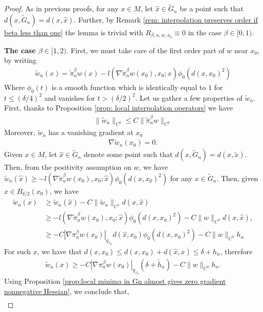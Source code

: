 \documentclass[11pt,reqno]{amsart}
\numberwithin{equation}{section}
\theoremstyle{plain}
\begin{document}
\begin{proof}
  As in previous proofs, for any $x \in M$, let $\hat x \in \tilde G_n$ be a point such that $d(x,\tilde G_n)=d(x,\hat x)$. Further, by Remark \ref{rem: interpolation preserves order if beta less than one} the lemma is trivial with $R_{\beta,n,w,x_0}\equiv 0$ in the case $\beta \in [0,1)$.
  
  \textbf{The case $\beta \in [1,2)$}. First, we must take care of the first order part of $w$ near $x_0$, by writing
  \begin{align*}
    \tilde w_n(x) = \tilde \pi_n^\beta w(x)-l(\nabla \tilde \pi_n^\beta w(x_0),x_0;x)\phi_{0}(d(x,x_0)^2)
  \end{align*}
  Where $\phi_{0}(t)$ is a smooth function which is identically equal to $1$ for $t\leq (\delta/4)^2$ and vanishes for $t>(\delta/2)^2$. Let us gather a few properties of $\tilde w_n$. First, thanks to Proposition \ref{prop: local interpolation operators} we have
  \begin{align*}
   \|\tilde w_n\|_{C^2}\leq C\|\tilde \pi_n^\beta w\|_{C^2}
  \end{align*}
  Moreover, $\tilde w_n$ has a vanishing gradient at $x_0$
  \begin{align*}
    \nabla \tilde w_n(x_0) = 0.
  \end{align*}
  Given $x\in M$, let $\hat x \in \tilde G_n$ denote some point such that $d(x,\tilde G_n)=d(x,\tilde x)$. Then, from the positivity assumption on $w$, we have $\tilde w_n(\hat x) \geq -l(\nabla \tilde \pi_n^\beta w(x_0),x_0;\hat x)\phi_0(d(x,x_0)^2)$ for any $x \in \tilde G_n$. Then, given $x \in B_{\delta/2}(x_0)$, we have
  \begin{align*}
    \tilde w_n(x) & \geq \tilde w_n(\hat x)-C\|\tilde w_n\|_{C^1}d(x,\hat x)\\
	& \geq -l(\nabla \tilde \pi_n^\beta w(x_0),x_0;\hat x)\phi_0(d(x,x_0)^2)-C \|w\|_{C^3}d(x,\hat x),\\
	& \geq -C|\nabla \pi^\beta_n w(x_0)|_{g_{x_0}}d(\hat x,x_0)\phi_0(d(x,x_0)^2)-C \|w\|_{C^3}h_n
  \end{align*}
  For such $x$, we have that $d(\hat x,x_0)\leq d(x,x_0)+d(\hat x,x) \leq \delta+h_n$, therefore
  \begin{align*}
    \tilde w_n(x) \geq -C|\nabla \pi^\beta_n w(x_0)|_{g_{x_0}}(\delta+\tilde h_n) -C \|w\|_{C^3}h_n.
  \end{align*}
  Using Proposition \ref{prop:local minima in Gn almost gives zero gradient nonnegative Hessian}, we conclude that,
  \begin{align}\label{eqFinDimApp:Almost order preserving inequality 1}

\end{align}
\end{proof}
\end{document}
